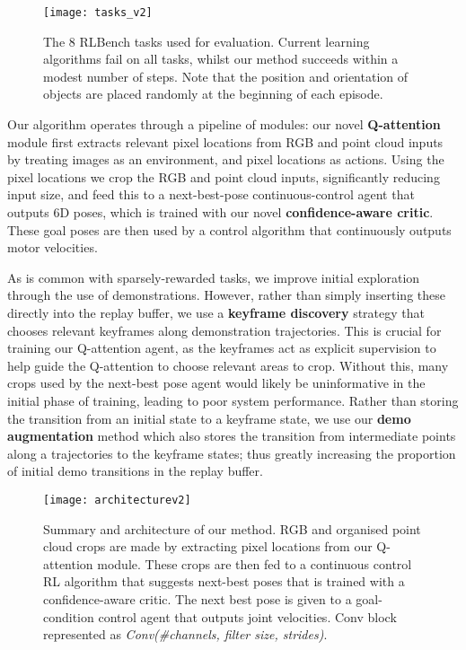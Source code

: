 \documentclass[letterpaper, 10 pt, journal, twoside]{IEEEtran}
\begin{document}
\begin{figure}
\centering
\texttt{[image: tasks\_v2]}
\caption{The 8 RLBench tasks used for evaluation. Current learning algorithms fail on all tasks, whilst our method succeeds within a modest number of steps. Note that the position and orientation of objects are placed randomly at the beginning of each episode.}
\label{fig:rlbench_tasks}
\vspace{-5px}
\end{figure}

Our algorithm operates through a pipeline of modules: our novel \textbf{Q-attention} module first extracts relevant pixel locations from RGB and point cloud inputs by treating images as an environment, and pixel locations as actions. Using the pixel locations we crop the RGB and point cloud inputs, significantly reducing input size, and feed this to a next-best-pose continuous-control agent that outputs 6D poses, which is trained with our novel \textbf{confidence-aware critic}.  These goal poses are then used by a control algorithm that continuously outputs motor velocities.

As is common with sparsely-rewarded tasks, we improve initial exploration through the use of demonstrations. However, rather than simply inserting these directly into the replay buffer, we use a \textbf{keyframe discovery} strategy that chooses relevant keyframes along demonstration trajectories. This is crucial for training our Q-attention agent, as the keyframes act as explicit supervision to help guide the Q-attention to choose relevant areas to crop. Without this, many crops used by the next-best pose agent would likely be uninformative in the initial phase of training, leading to poor system performance. Rather than storing the transition from an initial state to a keyframe state, we use our \textbf{demo augmentation} method which also stores the transition from intermediate points along a trajectories to the keyframe states; thus greatly increasing the proportion of initial demo transitions in the replay buffer.

\begin{figure*}
\centering
\texttt{[image: architecturev2]}
\caption{Summary and architecture of our method. RGB and organised point cloud crops are made by extracting pixel locations from our Q-attention module. These crops are then fed to a continuous control RL algorithm that suggests next-best poses that is trained with a confidence-aware critic. The next best pose is given to a goal-condition control agent that outputs joint velocities. Conv block represented as \textit{Conv(\#channels, filter size, strides)}.}
\label{fig:architecture}
\end{figure*}
\end{document}
